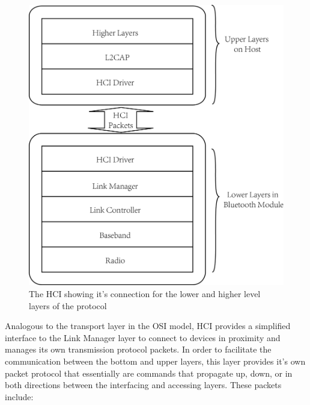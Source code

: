 \documentclass[a4paper,12pt]{article}
\begin{document}
\begin{figure}[h!]
\centering
\hspace*{2cm}\includegraphics[scale=.7]{Figures/Figure4.png}
\caption{The HCI showing it's connection for the lower and higher level layers of the protocol}
\label{fig:HCILayer}
\end{figure}

Analogous to the transport layer in the OSI model, HCI provides a simplified interface to the Link Manager layer to connect to devices in proximity and manages its own transmission protocol packets. In order to facilitate the communication between the bottom and upper layers, this layer provides it’s own packet protocol that essentially are commands that propagate up, down, or in both directions between the interfacing and accessing layers. These packets include:
\end{document}
